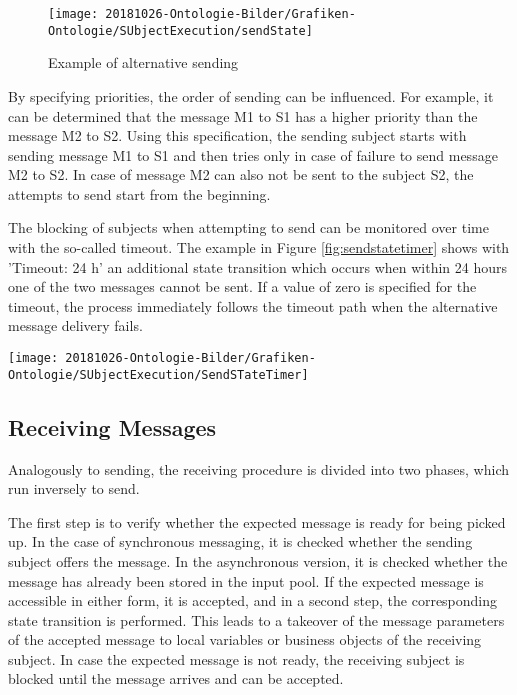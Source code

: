 \begin{figure}[htbp]
	\centering
	\texttt{[image: 20181026-Ontologie-Bilder/Grafiken-Ontologie/SUbjectExecution/sendState]}
	\caption[Example of alternative sending]{Example of alternative sending}
	\label{fig:sendstate}
\end{figure}

By specifying priorities, the order of sending can be influenced. For example, it can be determined that the message M1 to S1 has a higher priority than the message M2 to S2. Using this specification, the sending subject starts with sending message M1 to S1 and then tries only in case of failure to send message M2 to S2. In case of message M2 can also not be sent to the subject S2, the attempts to send start from the beginning.

The blocking of subjects when attempting to send can be monitored over time with the so-called timeout. The example in Figure \ref{fig:sendstatetimer} shows with 'Timeout: 24 h' an additional state transition which occurs when within 24 hours one of the two messages cannot be sent. If a value of zero is specified for the timeout, the process immediately follows the timeout path when the alternative message delivery fails.

\begin{figure*}[htbp]
	\centering
	\texttt{[image: 20181026-Ontologie-Bilder/Grafiken-Ontologie/SUbjectExecution/SendSTateTimer]}
	\caption[Send using time monitoring]{Send using time monitoring}
	\label{fig:sendstatetimer}
\end{figure*}

\subsection{Receiving Messages}

Analogously to sending, the receiving procedure is divided into two phases, which run inversely to send.

The first step is to verify whether the expected message is ready for being picked up. In the case of synchronous messaging, it is checked whether the sending subject offers the message. In the asynchronous version, it is checked whether the message has already been stored in the input pool. If the expected message is accessible in either form, it is accepted, and in a second step, the corresponding state transition is performed. This leads to a takeover of the message parameters of the accepted message to local variables or business objects of the receiving subject. In case the expected message is not ready, the receiving subject is blocked until the message arrives and can be accepted.

